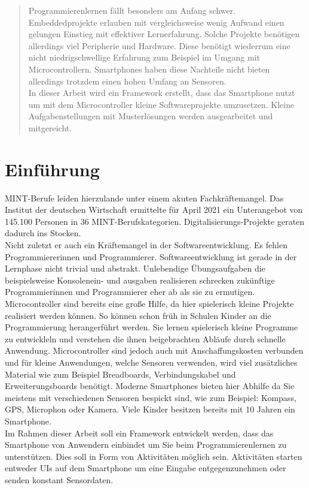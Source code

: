 \documentclass[11pt,a4paper]{report}
\begin{document}

\begin{abstract}
  Programmierenlernen fällt besonders am Anfang schwer.
  Embeddedprojekte erlauben mit vergleichsweise wenig Aufwand einen gelungen Einstieg mit effektiver Lernerfahrung.
  Solche Projekte benötigen allerdings viel Peripherie und Hardware.
  Diese benötigt wiederrum eine nicht niedrigschwellige Erfahrung zum Beispiel im Umgang mit Microcontrollern.
  Smartphones haben diese Nachteile nicht bieten allerdings trotzdem einen hohen Umfang an Sensoren.
  \\
  In dieser Arbeit wird ein Framework erstellt, dass das Smartphone nutzt um mit dem Microcontroller kleine Softwareprojekte umzusetzen.
  Kleine Aufgabenstellungen mit Musterlösungen werden ausgearbeitet und mitgereicht.
\end{abstract}

\tableofcontents

\chapter{Einführung} \label{chap:intro}
MINT-Berufe leiden hierzulande unter einem akuten Fachkräftemangel.
Das Institut der deutschen Wirtschaft ermittelte für April 2021 ein Unterangebot von 145.100 Personen \cite{mint_jahresreport} in 36 MINT-Berufskategorien. 
Digitalisierungs-Projekte geraten dadurch ins Stocken.
\\
Nicht zuletzt er auch ein Kräftemangel in der Softwareentwicklung.
Es fehlen Programmiererinnen und Programmierer.
Softwareentwicklung ist gerade in der Lernphase nicht trivial und abstrakt.
Unlebendige Übungsaufgaben die beispielsweise Konsolenein- und ausgaben realisieren schrecken zukünftige Programmierinnen und Programmierer eher ab als sie zu ermutigen.
\\
Microcontroller sind bereits eine große Hilfe, da hier spielerisch kleine Projekte realisiert werden können.
So können schon früh in Schulen Kinder an die Programmierung herangerführt werden.
Sie lernen spielerisch kleine Programme zu entwickleln und verstehen die ihnen beigebrachten Abläufe durch schnelle Anwendung.
Microcontroller sind jedoch auch mit Anschaffungskosten verbunden und für kleine Anwendungen, welche Sensoren verwenden, wird viel zusätzliches Material wie zum Beispiel Breadboards, Verbindungskabel und Erweiterungsboards benötigt.
Moderne Smartphones bieten hier Abhilfe da Sie meistens mit verschiedenen Sensoren bespickt sind, wie zum Beispiel: Kompass, GPS, Microphon oder Kamera.
Viele Kinder besitzen bereits mit 10 Jahren \cite{bitkom_smartphones} ein Smartphone. 
\\
Im Rahmen dieser Arbeit soll ein Framework entwickelt werden, dass das Smartphone von Anwendern einbindet um Sie beim Programmierenlernen zu unterstützen.
Dies soll in Form von Aktivitäten möglich sein. Aktivitäten starten entweder UIs auf dem Smartphone um eine Eingabe entgegenzunehmen oder senden konstant Sensordaten.
\end{document}
